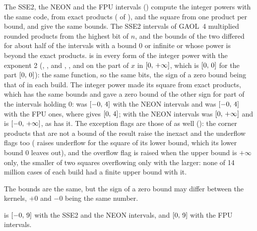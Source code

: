 \documentclass[12pt,a4paper,twoside,openright]{book}
\begin{document}
\medskip
The SSE2, the NEON and the FPU intervals () compute the
integer powers with the same code, from exact products
( of ), and
the square from one product per bound, and give the same bounds. The SSE2
intervals of GAOL~4 multiplied rounded products from the highest bit of
$n$, and the bounds of the two differed for about half of the intervals
with a bound $0$ or infinite or whose power is beyond the exact
products.\newinvfive{}  is  in every form of
the integer power with the exponent 2 (, ,
 and \code{[2]}, , and
 on the part of $x$ in
$[0,\,+\infty]$, which is $[0,\,0]$ for the part
$[0,\,0]$):\newinvfive{} the same function, so the same bits, the sign
of a zero bound being that of  in each build. The integer power
made its square from exact products, which has the same bounds and gave a
zero bound of the other sign for part of the intervals holding $0$:
 was $[-0,\,4]$ with the NEON intervals and
 was $[-0,\,4]$ with the FPU ones, where
 gives $[0,\,4]$; with the NEON intervals
 was $[0,\,+\infty]$ and is
$[-0,\,+\infty]$, as  has it. The exception flags are those
of  as well (): the corner products
that are not a bound of the result raise the inexact and the underflow
flags too ( raises underflow for the square
of its lower bound, which its lower bound $0$ leaves out), and the
overflow flag is raised when the upper bound is $+\infty$ only, the
smaller of two squares overflowing only with the larger: none of 14
million cases of each build had a finite upper bound with it.

\medskip
The bounds are the same, but the sign of a zero bound may differ between
the kernels, $+0$ and $-0$ being the same number.

\begin{Ex}
 is $[-0,\,9]$ with the SSE2 and the
NEON intervals, and $[0,\,9]$ with the FPU intervals.
\end{Ex}
\end{document}
